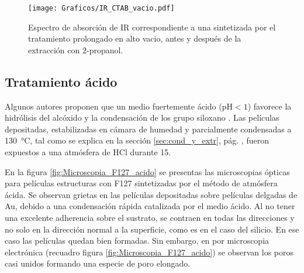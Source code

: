 {		\pagebreak
					
		\begin{figure}[!ht]
			 	\begin{center}
			 	\texttt{[image: Graficos/IR\_CTAB\_vacio.pdf]}
			 	\caption[FTIR \pdmC\space tratamiento prolongado.]{Espectro de absorción de IR correspondiente a una \pdmC\space sintetizada por el tratamiento prolongado en alto vacio, antes y después de la extracción con 2-propanol.}
			 	\label{fig:IR_CTAB_vacio}
			 	\end{center}
			 	\end{figure}
			
	\subsection{Tratamiento ácido}
		
		Algunos autores proponen que un medio fuertemente ácido (pH$<1$) favorece la hidrólisis del alcóxido y la condensación de los grupo siloxano \cite{Soler-Illia2011,Doshi2000a,Boissiere2000,Huo1996,Beck1992}. Las películas depositadas, estabilizadas en cámara de humedad y  parcialmente condensadas a \SI{130}{\celsius}, tal como se explica en la sección \ref{sec:cond_y_extr}, pág. \pageref{sec:cond_y_extr}, fueron expuestos a una atmósfera de HCl durante \SI{15}{\min}. 

		En la figura \ref{fig:Microscopia_F127_acido} se presentas las microscopias ópticas para películas estructuras con F127 sintetizadas por el método de atmósfera ácida. Se observan grietas en las películas depositadas sobre películas delgadas de Au, debido a una condensación rápida catalizada por el medio ácido. Al no tener una excelente adherencia sobre el sustrato, se contraen en todas las direcciones y no solo en la dirección normal a la superficie, como es en el caso del silicio\cite{Sakatani2006,Boissiere2005,Guillemin2010}. En ese caso las películas quedan bien formadas. Sin embargo, en por microscopia electrónica (recuadro figura \ref{fig:Microscopia_F127_acido}) se observan los poros casi unidos formando una especie de poro elongado.

}
